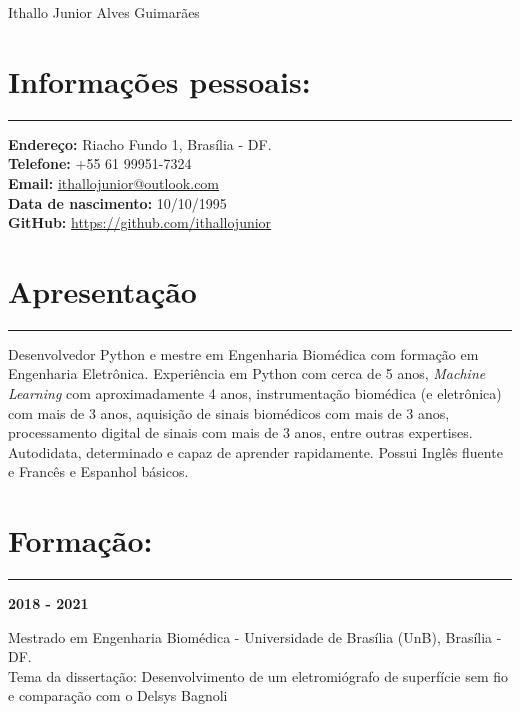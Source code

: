 \documentclass[11pt]{article}
\begin{document}
\begin{center}
\huge{Ithallo Junior Alves Guimarães}
\end{center}

\section{Informações pessoais:}
\hrule \vspace{0.1cm}
\begin{addmargin}{0.5cm}

\textbf{Endereço:}  Riacho Fundo 1, Brasília - DF. \\
\textbf{Telefone:}  +55 61 99951-7324 \\
\textbf{Email:}   \href{maito:ithallojunior@outlook.com}{ithallojunior@outlook.com} \\
\textbf{Data de nascimento:} 10/10/1995 \\
\textbf{GitHub:} \url{https://github.com/ithallojunior}

\end{addmargin}

\section{Apresentação}
\hrule \vspace{0.1cm}

\begin{addmargin}{0.5cm}

Desenvolvedor Python e mestre em Engenharia Biomédica com formação em Engenharia Eletrônica. 
Experiência em Python com cerca de 5 anos, 
\textit{Machine Learning} com aproximadamente 4 anos, instrumentação biomédica (e 
eletrônica) com mais de 3 anos, 
aquisição de sinais biomédicos com mais de 3 anos, processamento digital de sinais
com mais de 3 anos, entre outras expertises. 
Autodidata, determinado e 
capaz de aprender rapidamente. Possui Inglês fluente e Francês e Espanhol básicos.

\end{addmargin}

\section{Formação:}
\hrule \vspace{0.1cm}

\textbf{2018 - 2021}
\begin{addmargin}{0.5cm}
Mestrado em Engenharia Biomédica - Universidade de Brasília (UnB), Brasília - DF.\\ 
Tema da dissertação: Desenvolvimento de um eletromiógrafo de superfície sem fio e
comparação com o Delsys Bagnoli\\
\end{addmargin}
\end{document}
